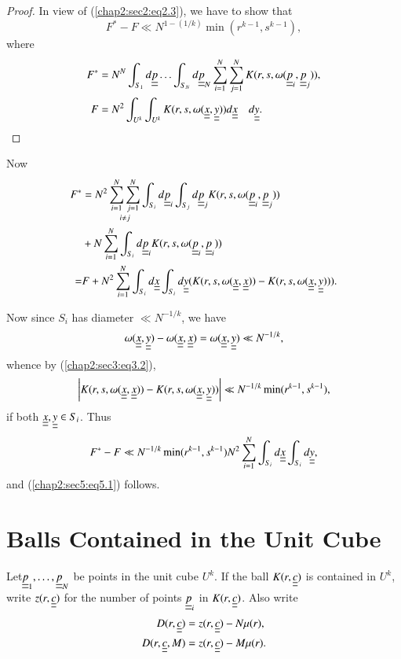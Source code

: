 \begin{proof}
  In view of (\ref{chap2:sec2:eq2.3}), we have to show that
\begin{equation*}
  F^{*} - F \ll N^{1-(1/k)} \min (r^{k-1}, s^{k-1}),\tag{5.1}\label{chap2:sec5:eq5.1}
\end{equation*}
where
\begin{align*}
F^{*} & = N^{N} \int_{S_{1}} d \underline{\underline{p}} \ldots \int_{S_{N}} d \underline{\underline{p}}_{N} \sum_{i=1}^{N} \sum_{j=1}^{N} K(r, s, \omega ( \underline{\underline{p}}_{i},  \underline{\underline{p}}_{j})),\\
F & = N^{2} \int_{U^{k}} \int_{U^{k}} K(r, s, \omega( \underline{\underline{x}},  \underline{\underline{y}})) d \underline{\underline{x}} \quad  d\underline{\underline{y}}.
\end{align*}
\end{proof}

Now
\begin{align*}
F^{*} & = N^{2} \mathop{\sum_{i=1}^{N} \sum_{j=1}^{N}}_{i \neq j} \int_{S_{i}} d \underline{\underline{p}}_{i} \int_{S_{j}} d \underline{\underline{p}}_{j} K(r, s, \omega( \underline{\underline{p}}_{i},  \underline{\underline{p}}_{j}))\\
& + N \sum_{i=1}^{N} \int_{S_{i}} d \underline{\underline{p}}_{i} K(r, s, \omega( \underline{\underline{p}}_{i},  \underline{\underline{p}}_{i}))\\
 = & F + N^{2} \sum_{i=1}^{N} \int_{S_{i}} d \underline{\underline{x}} \int_{S_{i}} d \underline{\underline{y}} (K(r, s, \omega( \underline{\underline{x}},  \underline{\underline{x}})) - K(r, s, \omega( \underline{\underline{x}},  \underline{\underline{y}}))). 
\end{align*}

Now since $S_{i}$ has diameter $\ll N^{-1/k}$, we have
$$
\omega(\underline{\underline{x}}, \underline{\underline{y}}) -\omega(\underline{\underline{x}}, \underline{\underline{x}}) = \omega (\underline{\underline{x}}, \underline{\underline{y}}) \ll N^{-1/k},
$$
whence by (\ref{chap2:sec3:eq3.2}),
$$
\left|K(r, s, \omega(\underline{\underline{x}}, \underline{\underline{x}})) - K(r, s, \omega(\underline{\underline{x}}, \underline{\underline{y}}))\right| \ll N^{-1/k} \min (r^{k-1}, s^{k-1}),
$$
if both $\underline{\underline{x}}, \underline{\underline{y}} \in S_{i}$. Thus
$$
F^{*} - F \ll N^{-1/k} \min (r^{k-1}, s^{k-1}) N^{2} \sum_{i=1}^{N} \int_{S_{i}} d\underline{\underline{x}} \int_{S_{i}} d\underline{\underline{y}}, 
$$
and (\ref{chap2:sec5:eq5.1}) follows.

\section{Balls Contained in the Unit Cube}\label{chap2:sec6}

Let\pageoriginale  $\underline{\underline{p}}_{1}, \ldots, \underline{\underline{p}}_{N}$ be points in the unit cube $U^{k}$. If the ball $K(r, \underline{\underline{c}})$ is contained in $U^{k}$, write $z(r, \underline{\underline{c}})$ for the number of points $\underline{\underline{p}}_{i}$ in $K(r, \underline{\underline{c}})$. Also write
\begin{align*}
  D(r, \underline{\underline{c}}) & = z(r, \underline{\underline{c}}) - N\mu(r),\\
  D(r, \underline{\underline{c}}, M) & = z(r, \underline{\underline{c}}) - M\mu(r). 
\end{align*}

